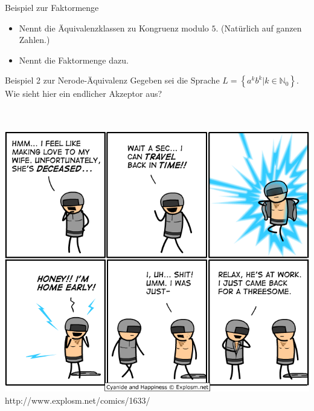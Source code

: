 \begin{frame}{Beispiel zur Faktormenge}
    \begin{itemize}
        \item Nennt die Äquivalenzklassen zu Kongruenz modulo $5$. (Natürlich auf ganzen Zahlen.)\\
        \item Nennt die Faktormenge dazu.\\
    \end{itemize}
\end{frame}
\begin{frame}{Beispiel 2 zur Nerode-Äquivalenz}
    Gegeben sei die Sprache $L = \left\{ a^k b^k | k \in \mathbb{N}_0 \right\}$. \\
    Wie sieht hier ein endlicher Akzeptor aus?
    \\
    \\
    \\
\end{frame}
\begin{frame}{}
    \includegraphics[scale=.40]{graphics/13/timetraveler4.png}\\
    http://www.explosm.net/comics/1633/
\end{frame}

